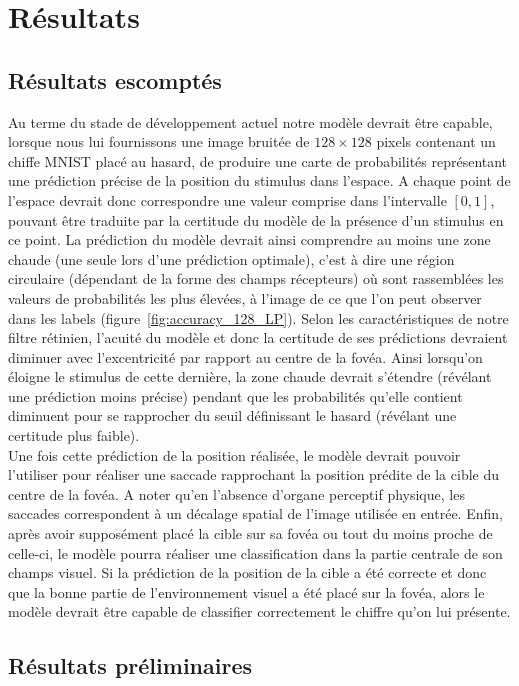 
\chapter{Résultats} %
 
\label{Résultats} %


\section{Résultats escomptés}

Au terme du stade de développement actuel notre modèle devrait être capable, lorsque nous lui fournissons une image bruitée de $128\times 128$ pixels contenant un chiffe MNIST placé au hasard, de produire une carte de probabilités représentant une prédiction précise de la position du stimulus dans l'espace.
A chaque point de l'espace devrait donc correspondre une valeur comprise dans l'intervalle $[0,1]$, pouvant être traduite par la certitude du modèle de la présence d'un stimulus en ce point.
La prédiction du modèle devrait ainsi comprendre au moins une zone chaude (une seule lors d'une prédiction optimale), c'est à dire une région circulaire (dépendant de la forme des champs récepteurs) où sont rassemblées les valeurs de probabilités les plus élevées, à l'image de ce que l'on peut observer dans les labels (figure~\ref{fig:accuracy_128_LP}).
Selon les caractéristiques de notre filtre rétinien, l'acuité du modèle et donc la certitude de ses prédictions devraient diminuer avec l'excentricité par rapport au centre de la fovéa.
Ainsi lorsqu'on éloigne le stimulus de cette dernière, la zone chaude devrait s'étendre (révélant une prédiction moins précise) pendant que les probabilités qu'elle contient diminuent pour se rapprocher du seuil définissant le hasard (révélant une certitude plus faible). \autocite{Freeman2011, Werner2014} \\
Une fois cette prédiction de la position réalisée, le modèle devrait pouvoir l'utiliser pour réaliser une saccade rapprochant la position prédite de la cible du centre de la fovéa.
A noter qu'en l'absence d'organe perceptif physique, les saccades correspondent à un décalage spatial de l'image utilisée en entrée.
Enfin, après avoir supposément placé la cible sur sa fovéa ou tout du moins proche de celle-ci, le modèle pourra réaliser une classification dans la partie centrale de son champs visuel.
Si la prédiction de la position de la cible a été correcte et donc que la bonne partie de l'environnement visuel a été placé sur la fovéa, alors le modèle devrait être capable de classifier correctement le chiffre qu'on lui présente. \autocite{Werner2014}

\section{Résultats préliminaires}